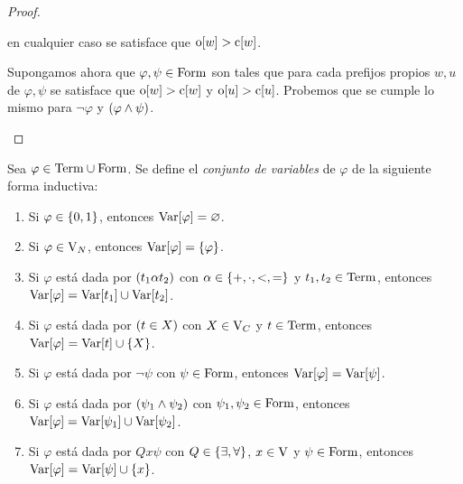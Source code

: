 \begin{agregado}
\begin{proof}
\begin{itemize}
\begin{enumerate}
			en cualquier caso se satisface que $\ABIERTO\bra*{w} >\CERRADO\bra*{w}$.
		\end{enumerate}

		Supongamos ahora que $\varphi,\psi\in\FORMULAS$ son tales que para cada prefijos propios $w, u$ de $\varphi,\psi$  se satisface que $\ABIERTO\bra*{w} >\CERRADO\bra*{w}$ y $\ABIERTO\bra*{u} >\CERRADO\bra*{u}$. Probemos que se cumple lo mismo para $\neg\varphi$ y $\pa*{\varphi\land\psi}$.
	\end{itemize}
\end{proof}
\end{agregado}

\begin{definition}
	Sea $\varphi\in\TERMINOS\cup\FORMULAS$. Se define el \emph{conjunto de variables} de $\varphi$ de la siguiente forma inductiva:

	\begin{enumerate}
		\item Si $\varphi\in\set*{0, 1}$, entonces $\VARIABLESDE{\varphi} =\varnothing$.
		\item Si $\varphi\in\VARIABLES[N]$, entonces $\VARIABLESDE{\varphi} =\set*{\varphi}$.
		\item Si $\varphi$ está dada por $\pa*{t_{1}\alpha t_{2}}$ con $\alpha\in\set*{+,\cdot, <, =}$ y $t_{1}, t_{2}\in\TERMINOS$, entonces $\VARIABLESDE{\varphi} =\VARIABLESDE{t_{1}}\cup\VARIABLESDE{t_{2}}$.
		\item Si $\varphi$ está dada por $\pa*{t\in X}$ con $X\in\VARIABLES[C]$ y $t\in\TERMINOS$, entonces $\VARIABLESDE{\varphi} =\VARIABLESDE{t}\cup\set*{X}$.
		\item Si $\varphi$ está dada por $\neg\psi$ con $\psi\in\FORMULAS$, entonces $\VARIABLESDE{\varphi} =\VARIABLESDE{\psi}$.
		\item Si $\varphi$ está dada por $\pa*{\psi_{1}\land\psi_{2}}$ con $\psi_{1},\psi_{2}\in\FORMULAS$, entonces $\VARIABLESDE{\varphi} =\VARIABLESDE{\psi_{1}}\cup\VARIABLESDE{\psi_{2}}$.
		\item Si $\varphi$ está dada por $Qx\psi$ con $Q\in\set*{\exists,\forall}$, $x\in\VARIABLES$ y $\psi\in\FORMULAS$, entonces $\VARIABLESDE{\varphi} =\VARIABLESDE{\psi}\cup\set*{x}$.
	\end{enumerate}
\end{definition}

